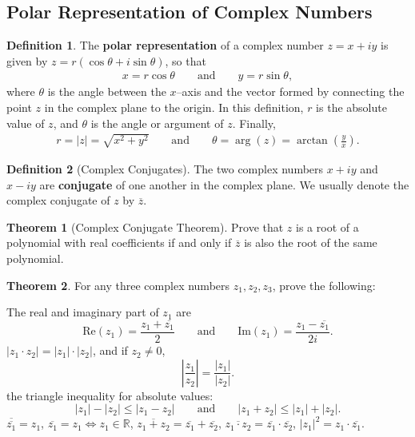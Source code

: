 \documentclass[12pt,a4paper]{memoir}
\theoremstyle{definition}
\newtheorem*{definition}{Definition}
\newtheorem{theorem}{Theorem}
\begin{document}
\subsection{Polar Representation of Complex Numbers}
\begin{tcolorbox}[title={Complex Conjugate Definitions}]
	\begin{definition}
		The \textbf{polar representation} of a complex number $z=x+iy$ is given by $z=r(\cos\theta+i\sin\theta)$, so that
		\begin{align*}
			x = r \cos \theta \qquad \text{and} \qquad y = r \sin \theta,
		\end{align*}
		where $\theta$ is the angle between the $x$--axis and the vector formed by connecting the point $z$ in the complex plane to the origin. In this definition, $r$ is the absolute value of $z$, and $\theta$ is the angle or argument of $z$. Finally,
		\begin{align*}
			r= |z| = \sqrt{x^2+y^2}\qquad \text{and} \qquad \theta=\arg(z)=\arctan\left(\frac{y}{x}\right).
		\end{align*}
	\end{definition}
	
	\begin{definition}[Complex Conjugates]
		The two complex numbers $x+iy$ and $x-iy$ are \textbf{conjugate} of one another in the complex plane. We usually denote the complex conjugate of $z$ by $\overline{z}$.
	\end{definition}
\end{tcolorbox}


\begin{theorem}[Complex Conjugate Theorem]
	Prove that $z$ is a root of a polynomial with real coefficients if and only if $\overline{z}$ is also the root of the same polynomial.
\end{theorem}


\begin{theorem}
	For any three complex numbers $z_1,z_2,z_3$, prove the following:
	\begin{tasks}
		\task The real and imaginary part of $z_1$ are
		\[\text{Re}(z_1)=\frac{z_1+\overline{z_1}}{2} \qquad \text{and} \qquad \text{Im}(z_1)=\frac{z_1-\overline{z_1}}{2i}.\]
		\task $|z_1\cdot z_2|  = |z_1| \cdot |z_2|$, and if $z_2\neq 0$,
		\[\left|\frac{z_1}{z_2}\right|=\frac{|z_1|}{|z_2|}.\]
		\task the triangle inequality for absolute values:
		\[|z_1|-|z_2| \leq |z_1-z_2| \qquad \text{and} \qquad |z_1+z_2| \leq |z_1|+|z_2|.\]
		\task $\overline{\overline{z_1}}=z_1$,
		\task $\overline{z_1}=z_1 \iff z_1 \in \mathbb R$,
		\task $\overline{z_1+z_2} = \overline{z_1}+\overline{z_2}$,
		\task $\overline{z_1\cdot z_2} = \overline{z_1}\cdot \overline{z_2}$,
		\task $|z_1|^2 = z_1\cdot \overline{z_1}$.
	\end{tasks}
\end{theorem}
\end{document}
